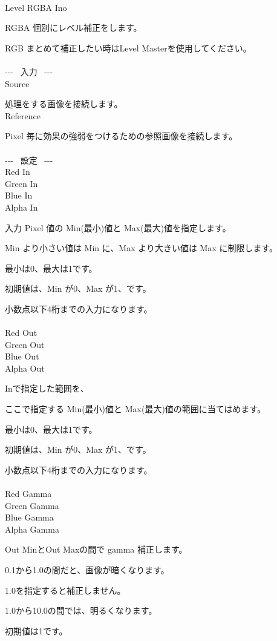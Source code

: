 \documentclass[a4paper,12pt]{article}
\begin{document}
\thispagestyle{empty}

\Large
\noindent \\
Level RGBA Ino\medskip
\par
\normalsize
RGBA 個別にレベル補正をします。\par
RGB まとめて補正したい時は\textquotedbl Level Master\textquotedbl を使用してください。\\
\\
-{-}- \ 入力 \ -{-}-\\
Source\par
処理をする画像を接続します。\\
Reference\par
Pixel 毎に効果の強弱をつけるための参照画像を接続します。\\
\\
-{-}- \ 設定 \ -{-}-\\
Red In\\
Green In\\
Blue In\\
Alpha In\par
入力 Pixel 値の Min(最小)値と Max(最大)値を指定します。\par
Min より小さい値は Min に、Max より大きい値は Max に制限します。\par
最小は0、最大は1です。\par
初期値は、Min が0、Max が1、です。\par
小数点以下4桁までの入力になります。\\
\\
Red Out\\
Green Out\\
Blue Out\\
Alpha Out\par
\textquotedbl In\textquotedbl で指定した範囲を、\par
ここで指定する Min(最小)値と Max(最大)値の範囲に当てはめます。\par
最小は0、最大は1です。\par
初期値は、Min が0、Max が1、です。\par
小数点以下4桁までの入力になります。\\
\\
Red Gamma\\
Green Gamma\\
Blue Gamma\\
Alpha Gamma\par
\textquotedbl Out Min\textquotedbl と\textquotedbl Out Max\textquotedbl の間で gamma 補正します。\par
0.1から1.0の間だと、画像が暗くなります。\par
1.0を指定すると補正しません。\par
1.0から10.0の間では、明るくなります。\par
初期値は1です。
\end{document}
